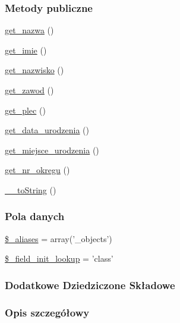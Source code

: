 \subsubsection*{Metody publiczne}
\begin{DoxyCompactItemize}
\item 
\hyperlink{classep_____object_ac0818f0049d7b84f08f77128f54cee36}{get\-\_\-nazwa} ()
\item 
\hyperlink{classep_____object_ac4b0c85dc2a130038f2d118dbd0c3d77}{get\-\_\-imie} ()
\item 
\hyperlink{classep_____object_abdd1d7ff92508da7f748ba1feec97af0}{get\-\_\-nazwisko} ()
\item 
\hyperlink{classep_____object_af80ca8310b60004454dd02a387deaa2c}{get\-\_\-zawod} ()
\item 
\hyperlink{classep_____object_ac7f9af5c3fa024e4c26a7b6bd4ce4bb4}{get\-\_\-plec} ()
\item 
\hyperlink{classep_____object_a880b240cd2d8c336fd1709bf0cb1ae2c}{get\-\_\-data\-\_\-urodzenia} ()
\item 
\hyperlink{classep_____object_ac57c08ec5e394a19c5bd9280c8376182}{get\-\_\-miejsce\-\_\-urodzenia} ()
\item 
\hyperlink{classep_____object_a2645a9f0aa5b0ccc482943348c033d0a}{get\-\_\-nr\-\_\-okregu} ()
\item 
\hyperlink{classep_____object_a7516ca30af0db3cdbf9a7739b48ce91d}{\-\_\-\-\_\-to\-String} ()
\end{DoxyCompactItemize}
\subsubsection*{Pola danych}
\begin{DoxyCompactItemize}
\item 
\hyperlink{classep_____object_ab4e31d75f0bc5d512456911e5d01366b}{\$\-\_\-aliases} = array('\-\_\-objects')
\item 
\hyperlink{classep_____object_a4a4d54ae35428077a7c61ec8a5139af3}{\$\-\_\-field\-\_\-init\-\_\-lookup} = 'class'
\end{DoxyCompactItemize}
\subsubsection*{Dodatkowe Dziedziczone Składowe}


\subsubsection{Opis szczegółowy}


